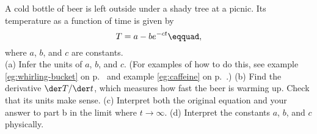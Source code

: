 A cold bottle of beer is left outside under a shady tree
at a picnic. Its temperature as a function of time is given
by
\begin{equation*}
  T = a - b e^{-ct}\eqquad,
\end{equation*}
where $a$, $b$, and $c$ are constants.\\
(a) Infer the units of $a$, $b$, and $c$. (For examples of how to do this, see
example \ref{eg:whirling-bucket} on p.~\pageref{eg:whirling-bucket} and
example \ref{eg:caffeine} on p.~\pageref{eg:caffeine}.)\hwendpart
(b) Find the derivative $\der T/\der t$, which measures how fast the beer
is warming up. Check that its units make sense.\hwendpart
(c) Interpret both the original equation and
your answer to part b in the limit where $t\rightarrow\infty$.\hwendpart
(d) Interpret the constants $a$, $b$, and $c$ physically.
